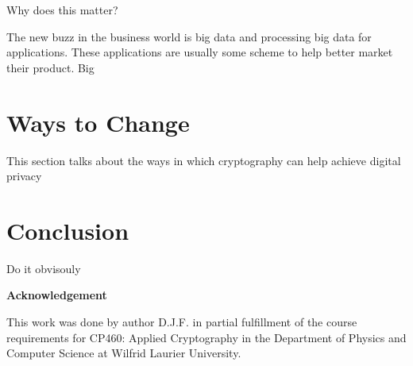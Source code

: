 \documentclass[12pt]{article}
\begin{document}
Why does this matter?


The new buzz in the business world is big data and processing big data for applications. These applications are usually some scheme to help better market their product. Big 

\section{Ways to  Change}\label{sec:developers}
This section talks about the ways in which cryptography can help achieve digital privacy

\section{Conclusion}\label{sec:conclusion}
Do it obvisouly

\begin{center}
{\bf Acknowledgement}
\end{center}
This work was done by author D.J.F. in partial fulfillment of the course requirements for CP460: Applied Cryptography in the Department of Physics and Computer Science at Wilfrid Laurier University.
\end{document}
